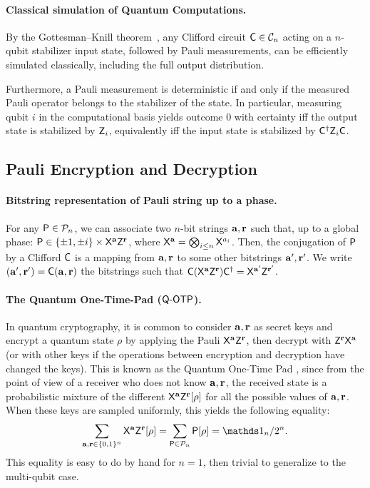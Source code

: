 \paragraph{Classical simulation of Quantum Computations.}
By the Gottesman–Knill theorem~\cite{G98heisenberg}, any Clifford circuit $\C\in \Clifford_n$ acting on a $n$-qubit stabilizer input state, followed by Pauli measurements, can be efficiently simulated classically, including the full output distribution.

Furthermore, a Pauli measurement is deterministic if and only if the measured Pauli operator belongs to the stabilizer of the state. In particular, measuring qubit $i$ in the computational basis yields outcome $0$ with certainty iff the output state is stabilized by $\Z_i$, equivalently iff the input state is stabilized by $\C^\dagger \Z_i \C$.
\subsection{Pauli Encryption and Decryption}
\label{prelim:Clifford conjugation}

\paragraph{Bitstring representation of Pauli string up to a phase.}
For any $\P\in\Pauli_n$, we can associate two $n$-bit strings $\a, \r$ such that, up to a global phase: $\P\in \{\pm 1, \pm i\} \times \X^\a\Z^\r$, where $\X^\a = \bigotimes_{i\leq n}\X^{a_i}$.
 Then, the conjugation of $\P$ by a Clifford $\C$ is a mapping from $\a, \r$ to some other bitstrings $\a', \r'$. We write $(\a', \r')=\C(\a, \r)$ the bitstrings such that $\C (\Enc{\a}{\r})\C^\dagger = \Enc{\a'}{\r'}$.

\paragraph{The Quantum One-Time-Pad ($\QOTP$).}
In quantum cryptography, it is common to consider $\a, \r$ as secret keys and encrypt a quantum state $\rho$ by applying the Pauli $\Enc{\a}{\r}$, then decrypt with $\Dec{\a}{\r}$ (or with other keys if the operations between encryption and decryption have changed the keys). This is known as the Quantum One-Time Pad \cite{C05secure}, since from the point of view of a receiver who does not know $\a, \r$, the received state is a probabilistic mixture of the different $\Enc{\a}{\r}[\rho]$ for all the possible values of $\a, \r$. When these keys are sampled uniformly, this yields the following equality:
\begin{equation}
    \sum_{\a, \r\in\{0,1\}^n} \Enc{\a}{\r}[\rho] = \sum_{\P\in\Pauli_n} \P[\rho] = \id_n/2^n.
\end{equation}
This equality is easy to do by hand for $n=1$, then trivial to generalize to the multi-qubit case.

